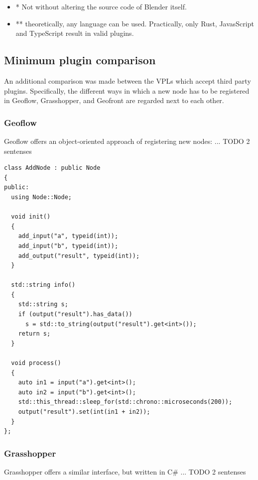 \begin{itemize}[ ]
  \item * Not without altering the source code of Blender itself.
  \item ** theoretically, any language can  be used. 
  Practically, only Rust, JavasScript and TypeScript result in valid plugins. 
\end{itemize}

\subsection{Minimum plugin comparison}

An additional comparison was made between the VPLs which accept third party plugins.
Specifically, the different ways in which a new node has to be registered in Geoflow, Grasshopper, and Geofront are regarded next to each other.



\subsubsection{Geoflow}

Geoflow offers an object-oriented approach of registering new nodes:
... TODO 2 sentenses

\begin{lstlisting}
class AddNode : public Node
{
public:
  using Node::Node;

  void init()
  {
    add_input("a", typeid(int));
    add_input("b", typeid(int));
    add_output("result", typeid(int));
  }

  std::string info()
  {
    std::string s;
    if (output("result").has_data())
      s = std::to_string(output("result").get<int>());
    return s;
  }

  void process()
  {
    auto in1 = input("a").get<int>();
    auto in2 = input("b").get<int>();
    std::this_thread::sleep_for(std::chrono::microseconds(200));
    output("result").set(int(in1 + in2));
  }
};
\end{lstlisting}

\subsubsection{Grasshopper}

Grasshopper offers a similar interface, but written in C\# 
... TODO 2 sentenses

